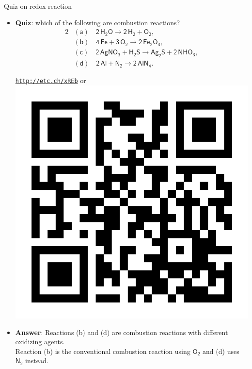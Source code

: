 \begin{frame}{Quiz on redox reaction}
	\begin{itemize}
		\item \alert{\textbf{Quiz}}:  which of the following are combustion reactions?\\[-20pt]
		\begin{alignat*}{2}
			& \mathsf{(a) \quad 2\,H_2O \rightarrow 2\,H_2+O_2,} \\[-3pt]
			& \mathsf{(b) \quad 4\,Fe+3\,O_2 \rightarrow 2\,Fe_2O_3, }\\[-3pt]
			& \mathsf{(c) \quad  2\,AgNO_3+H_2S \rightarrow Ag_2S+2\,NHO_3, }\\[-3pt]
			& \mathsf{(d) \quad  2\,Al+N_2 \rightarrow 2\,AlN_4.}
		\end{alignat*}
    	 \vskip -40pt
		\begin{center}
			\href{http://etc.ch/xREb}{\textcolor{indigo(dye)}{\tt http://etc.ch/xREb}} \quad or \quad
			\includegraphics[height=0.17\columnwidth]{figures/chemical-kinetics/polls.png}
		\end{center}
		\hiddenpause
		\item {\textbf{Answer}}: Reactions (b) and (d) are combustion reactions with different oxidizing agents. \\
		Reaction  (b) is the conventional combustion reaction using  $\mathsf{O_2}$  and (d) uses  $\mathsf{N_2}$  instead.
		
	\end{itemize}
	
\end{frame}
